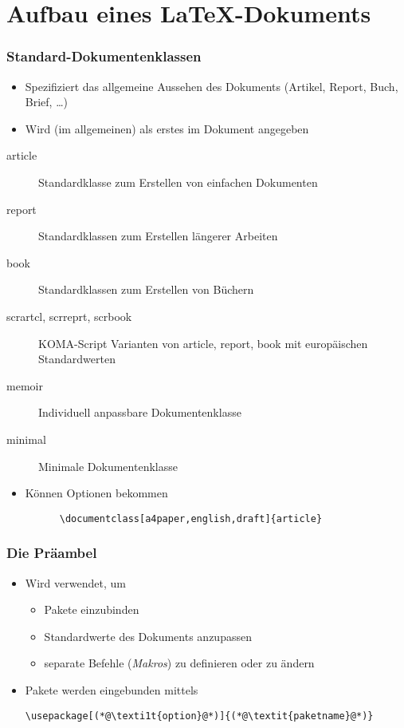 
\subtitle{Einführung}
\date{Sommersemester 2017}


\section{Aufbau eines \LaTeX-Dokuments}

\begin{frame}[fragile]
  \frametitle{Standard-Dokumentenklassen}
  \begin{itemize}
    \item Spezifiziert das allgemeine Aussehen des Dokuments (Artikel, Report, Buch,
    Brief, \dots)
    \item Wird (im allgemeinen) als erstes im Dokument angegeben
  \end{itemize}  
  \begin{description}
    \item[article] Standardklasse zum Erstellen von einfachen Dokumenten
    \item[report] Standardklassen zum Erstellen längerer Arbeiten
    \item[book] Standardklassen zum Erstellen von Büchern
    \item[scrartcl, scrreprt, scrbook] KOMA-Script Varianten von article, report, book mit
      europäischen Standardwerten
    \item[memoir] Individuell anpassbare Dokumentenklasse
    \item[minimal] Minimale Dokumentenklasse
  \end{description}
  \begin{itemize}
    \item<+-> Können Optionen bekommen
    \begin{lstlisting}
      \documentclass[a4paper,english,draft]{article}
    \end{lstlisting}
  \end{itemize}
\end{frame}

\begin{frame}[fragile]
  \frametitle{Die Präambel}

  \begin{itemize}
  \item<1-> Wird verwendet, um
    \begin{itemize}
    \item<2-> Pakete einzubinden
    \item<3-> Standardwerte des Dokuments anzupassen
    \item<4-> separate Befehle (\emph{Makros}) zu definieren oder zu ändern
    \end{itemize}
  \item<2-> Pakete werden eingebunden mittels
\begin{lstlisting}
\usepackage[(*@\texti1t{option}@*)]{(*@\textit{paketname}@*)}
\end{lstlisting}
  \end{itemize}

\end{frame}

